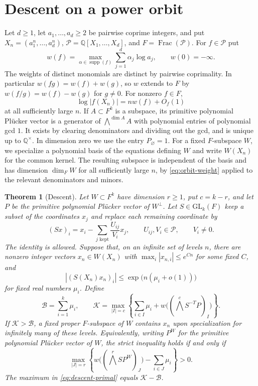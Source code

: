 \documentclass[11pt,a4paper,reqno]{amsart}
\newtheorem{theorem}{Theorem}[section]
\theoremstyle{definition}
\theoremstyle{remark}
\numberwithin{equation}{section}
\begin{document}
\section{Descent on a power orbit}\label{sec:descent}

Let \(d\geq 1\), let \(a_1,\ldots,a_d\geq 2\) be pairwise coprime
integers, and put \(X_n=(a_1^n,\ldots,a_d^n)\),
\(\mathcal P=\mathbb Q[X_1,\ldots,X_d]\), and
\(F=\operatorname{Frac}(\mathcal P)\). For \(f\in\mathcal P\) put
\[
 w(f)=\max_{\alpha\in\operatorname{supp}(f)}
           \sum_{j=1}^d \alpha_j\log a_j,\qquad w(0)=-\infty .
\]
The weights of distinct monomials are distinct by pairwise coprimality.
In particular \(w(fg)=w(f)+w(g)\), so \(w\) extends to \(F\) by
\(w(f/g)=w(f)-w(g)\) for \(g\ne 0\). For nonzero \(f\in F\),
\begin{equation}\label{eq:orbit-weight}
 \log |f(X_n)|=nw(f)+O_f(1)
\end{equation}
at all sufficiently large \(n\). If \(A\subset F^k\) is a subspace,
its primitive polynomial Pl\"ucker vector is a generator of
\(\bigwedge^{\dim A} A\) with polynomial entries of polynomial gcd \(1\).
It exists by clearing denominators and dividing out the gcd, and is
unique up to \(\mathbb Q^\times\). In dimension zero we use the entry
\(P_{\varnothing}=1\). For a fixed \(F\)-subspace \(W\), we specialize
a polynomial basis of the equations defining \(W\) and write \(W(X_n)\)
for the common kernel. The resulting subspace is independent of the
basis and has dimension \(\dim_F W\) for all sufficiently large \(n\),
by \eqref{eq:orbit-weight} applied to the relevant denominators and minors.

\begin{theorem}[Descent]\label{thm:descent}
Let \(W\subset F^k\) have dimension \(r\geq 1\), put \(c=k-r\), and let
\(P\) be the primitive polynomial Pl\"ucker vector of \(W^\perp\).
Let \(S\in\mathrm{GL}_k(F)\) keep a subset of the coordinates \(x_j\) and
replace each remaining coordinate by
\[
 (Sx)_i=x_i-\sum_{\text{\(j\) kept}}\frac{U_{ij}}{V_i}x_j,
 \qquad U_{ij},V_i\in\mathcal P,\qquad V_i\ne0 .
\]
The identity is allowed. Suppose that, on an infinite set of levels
\(n\), there are nonzero integer vectors \(x_n\in W(X_n)\) with
\(\max_i |x_{n,i}|\leq e^{Cn}\) for some fixed \(C\), and
\[
 |(S(X_n)x_n)_i|\leq \exp\bigl(n(\mu_i+o(1))\bigr)
\]
for fixed real numbers \(\mu_i\). Define
\begin{equation}\label{eq:descent-K}
 \mathcal B=\sum_{i=1}^k\mu_i,\qquad
 \mathcal K=\max_{|I|=c}
    \left\{\sum_{i\in I}\mu_i+
           w\bigl((\bigwedge^c S^{-T}P)_I\bigr)\right\}.
\end{equation}
If \(\mathcal K>\mathcal B\), a fixed proper \(F\)-subspace of \(W\)
contains \(x_n\) upon specialization for infinitely many of these levels.
Equivalently, writing \(P^W\) for the primitive polynomial Pl\"ucker
vector of \(W\), the strict inequality holds if and only if
\begin{equation}\label{eq:descent-primal}
 \max_{|J|=r}
   \left\{w\bigl((\bigwedge^r S P^W)_J\bigr)
           -\sum_{i\in J}\mu_i\right\}>0.
\end{equation}
The maximum in \eqref{eq:descent-primal} equals \(\mathcal K-\mathcal B\).
\end{theorem}
\end{document}

